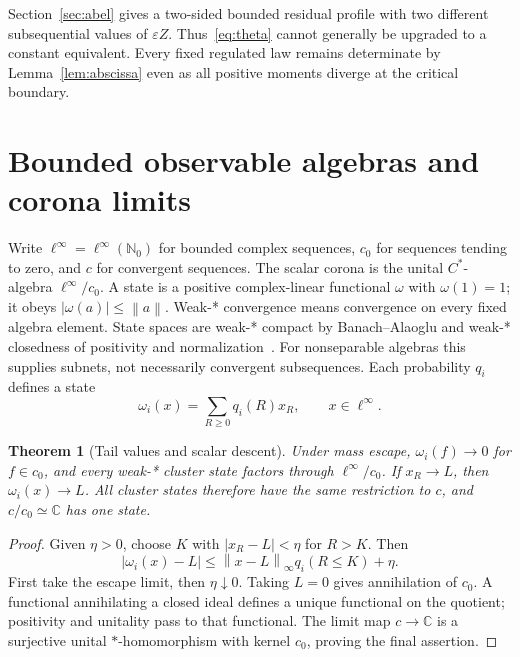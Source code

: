 \documentclass[11pt]{article}
\newtheorem{theorem}{Theorem}[section]
\theoremstyle{definition}
\newcommand{\N}{\mathbb N_0}
\newcommand{\C}{\mathbb C}
\newcommand{\eps}{\varepsilon}
\newcommand{\norm}[1]{\left\lVert#1\right\rVert}
\begin{document}
Section~\ref{sec:abel} gives a two-sided bounded residual profile with two different subsequential values of $\eps Z$.
Thus~\eqref{eq:theta} cannot generally be upgraded to a constant equivalent.
Every fixed regulated law remains determinate by Lemma~\ref{lem:abscissa} even as all positive moments diverge at the critical boundary.

\section{Bounded observable algebras and corona limits}
\label{sec:corona}

Write $\ell^\infty=\ell^\infty(\N)$ for bounded complex sequences, $c_0$ for sequences tending to zero, and $c$ for convergent sequences.
The scalar corona is the unital $C^*$-algebra $\ell^\infty/c_0$.
A state is a positive complex-linear functional $\omega$ with $\omega(1)=1$; it obeys $|\omega(a)|\leq\norm a$.
Weak-* convergence means convergence on every fixed algebra element.
State spaces are weak-* compact by Banach--Alaoglu and weak-* closedness of positivity and normalization~\cite{Alaoglu1940,Murphy1990}.
For nonseparable algebras this supplies subnets, not necessarily convergent subsequences.
Each probability $q_i$ defines a state
\begin{equation}
 \omega_i(x)=\sum_{R\geq0}q_i(R)x_R,\qquad x\in\ell^\infty.
\end{equation}

\begin{theorem}[Tail values and scalar descent]
\label{thm:tail}
Under mass escape, $\omega_i(f)\to0$ for $f\in c_0$, and every weak-* cluster state factors through $\ell^\infty/c_0$.
If $x_R\to L$, then $\omega_i(x)\to L$.
All cluster states therefore have the same restriction to $c$, and $c/c_0\simeq\C$ has one state.
\end{theorem}
\begin{proof}
Given $\eta>0$, choose $K$ with $|x_R-L|<\eta$ for $R>K$.
Then
\begin{equation}
 |\omega_i(x)-L|\leq\norm{x-L}_\infty q_i(R\leq K)+\eta.
\end{equation}
First take the escape limit, then $\eta\downarrow0$.
Taking $L=0$ gives annihilation of $c_0$.
A functional annihilating a closed ideal defines a unique functional on the quotient; positivity and unitality pass to that functional.
The limit map $c\to\C$ is a surjective unital $*$-homomorphism with kernel $c_0$, proving the final assertion.
\end{proof}
\end{document}
